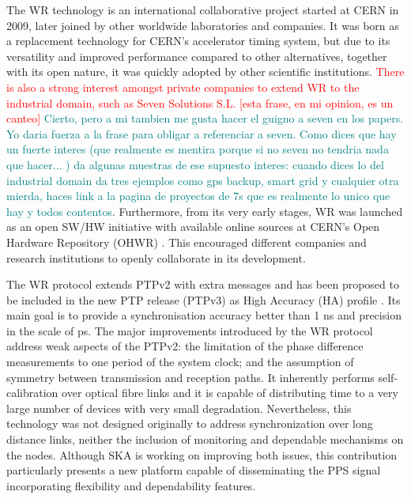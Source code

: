 The WR technology \cite{Wlostowski2011} is an international collaborative
project started at CERN in 2009, later joined by other worldwide laboratories and
companies. It was born as a replacement technology for CERN's accelerator timing system,
but due to its versatility and improved performance compared to other
alternatives, together with its open nature, it was quickly adopted by other
scientific institutions. \textcolor{red}{There is also a strong interest amongst private companies to
extend WR to the industrial domain, such as Seven Solutions S.L. 
\cite{sevensols:wr} [esta frase, en mi opinion, es un canteo]} 
\textcolor{teal}{Cierto, pero a mi tambien me gusta hacer el guigno a seven en 
los papers. Yo daria fuerza a la frase para obligar a referenciar a seven. Como 
dices que hay un fuerte interes (que realmente es mentira porque si no seven no 
tendria nada que hacer... ) da algunas muestras de ese supuesto interes: cuando 
dices lo del industrial domain da tres ejemplos como gps backup, smart grid y 
cualquier otra mierda, haces link a la pagina de proyectos de 7s que es 
realmente lo unico que hay y todos contentos}. 
Furthermore, from its very early stages, WR was launched as an open SW/HW
initiative with available online sources at CERN's Open Hardware Repository (OHWR)
\cite{ohwr:repo}. This encouraged different companies and research institutions
to openly collaborate in its development.

The WR protocol extends PTPv2 with extra messages and has been proposed to be
included in the new PTP release (PTPv3) as High Accuracy (HA) profile
\cite{wr:maciej-ptpv3-standard} . Its main goal is to provide a synchronisation
accuracy better than 1 ns and precision in the scale of ps. The major
improvements introduced by the WR protocol address weak aspects of the PTPv2:
the limitation of the phase difference measurements to one period of the system
clock; and the assumption of symmetry between transmission and reception
paths. It inherently performs self-calibration over optical fibre links and it
is capable of distributing time to a very large number of devices with very
small degradation. Nevertheless, this technology was not designed originally
to address synchronization over long distance links, neither the inclusion of monitoring and dependable
mechanisms on the nodes. Although SKA is working on improving both issues, this contribution
particularly presents a new platform capable of disseminating the PPS signal incorporating flexibility and dependability features.  

